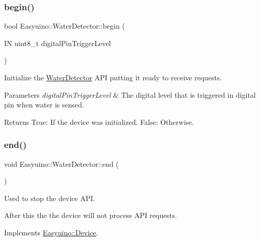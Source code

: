 \subsubsection{\texorpdfstring{begin()}{begin()}\hspace{0.1cm}{\footnotesize\ttfamily [2/2]}}
{\footnotesize\ttfamily bool Easyuino\+::\+Water\+Detector\+::begin (\begin{DoxyParamCaption}\item[{IN uint8\+\_\+t}]{digital\+Pin\+Trigger\+Level }\end{DoxyParamCaption})}



Initialize the \hyperlink{class_easyuino_1_1_water_detector}{Water\+Detector} A\+PI putting it ready to receive requests. 


\begin{DoxyParams}{Parameters}
{\em digital\+Pin\+Trigger\+Level} & The digital level that is triggered in digital pin when water is sensed. \\
\hline
\end{DoxyParams}
\begin{DoxyReturn}{Returns}
True\+: If the device was initialized. False\+: Otherwise. 
\end{DoxyReturn}
\mbox{\label{class_easyuino_1_1_water_detector_a9c1473536f47b2a7d8e1f8fb1bf5f3fd}} 
\subsubsection{\texorpdfstring{end()}{end()}}
{\footnotesize\ttfamily void Easyuino\+::\+Water\+Detector\+::end (\begin{DoxyParamCaption}{ }\end{DoxyParamCaption})\hspace{0.3cm}{\ttfamily [virtual]}}



Used to stop the device A\+PI. 

After this the the device will not process A\+PI requests. 

Implements \hyperlink{class_easyuino_1_1_device_ab31018ef64adc84aa2ea575b2297548f}{Easyuino\+::\+Device}.

\mbox{\label{class_easyuino_1_1_water_detector_a0dfefd3b3aa2ed21f30ceb8041a8652a}} 
